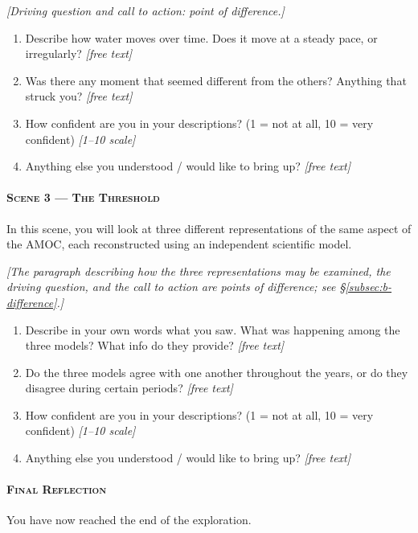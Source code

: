\emph{[Driving question and call to action: point of difference.]}

\begin{enumerate}[leftmargin=2.4em, itemsep=3pt, start=11]
\item Describe how water moves over time. Does it move at a steady pace, or irregularly?
      \emph{[free text]}
\item Was there any moment that seemed different from the others? Anything that struck you?
      \emph{[free text]}
\item How confident are you in your descriptions? (1 = not at all, 10 = very confident)
      \emph{[1--10 scale]}
\item Anything else you understood / would like to bring up? \emph{[free text]}
\end{enumerate}

\paragraph{\textsc{Scene 3 --- The Threshold}}
In this scene, you will look at three different representations of the same aspect of the
AMOC, each reconstructed using an independent scientific model.

\emph{[The paragraph describing how the three representations may be examined, the driving
question, and the call to action are points of difference; see \S\ref{subsec:b-difference}.]}

\begin{enumerate}[leftmargin=2.4em, itemsep=3pt, start=15]
\item Describe in your own words what you saw. What was happening among the three models? What
      info do they provide? \emph{[free text]}
\item Do the three models agree with one another throughout the years, or do they disagree
      during certain periods? \emph{[free text]}
\item How confident are you in your descriptions? (1 = not at all, 10 = very confident)
      \emph{[1--10 scale]}
\item Anything else you understood / would like to bring up? \emph{[free text]}
\end{enumerate}

\paragraph{\textsc{Final Reflection}}
You have now reached the end of the exploration.

